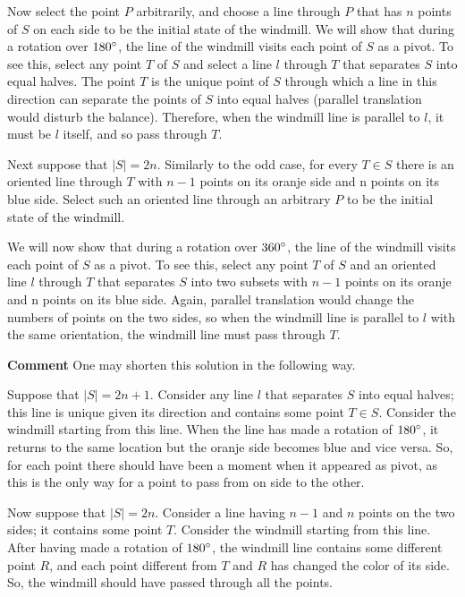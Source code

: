 \begin{problem}
 Now select the point $P$ arbitrarily, and choose a line through $P$ that has $n$ points of $S$ on each side to be the initial state of the windmill. 
We will show that during a rotation over $180\degree$, the line of the windmill visits each point of $S$ as a pivot. To see this, select any point $T$ of $S$ and select a line $l$ through $T$ that separates $S$ into equal halves. The point $T$ is the unique point of $S$ through which a line in this direction can separate the points of $S$ into equal halves (parallel translation would disturb the balance). Therefore, when the windmill line is parallel to $l$, it must be $l$ itself, and so pass through $T$.

Next suppose that $|S| = 2n$. Similarly to the odd case, for every $T \in S$ there is an oriented line through $T$ with $n−1$ points on its oranje side and n points on its blue side. Select such an oriented line through an arbitrary $P$ to be the initial state of the windmill. 

We will now show that during a rotation over $360\degree$, the line of the windmill visits each point of $S$ as a pivot. To see this, select any point $T$ of $S$ and an oriented line $l$ through $T$ that separates $S$ into two subsets with $n − 1$ points on its oranje and n points on its blue side. Again, parallel translation would change the numbers of points on the two sides, so when the windmill line is parallel to $l$ with the same orientation, the windmill line must pass through $T$.

\textbf{Comment} One may shorten this solution in the following way. 

Suppose that $|S| = 2n + 1$. Consider any line $l$ that separates $S$ into equal halves; this line is unique given its direction and contains some point $T \in S$. Consider the windmill starting from this line. When the line has made a rotation of $180\degree$, it returns to the same location but the oranje side becomes blue and vice versa. So, for each point there should have been a moment when it appeared as pivot, as this is the only way for a point to pass from on side to the other. 

Now suppose that $|S| = 2n$. Consider a line having $n−1$ and $n$ points on the two sides; it contains some point $T$. Consider the windmill starting from this line. After having made a rotation of $180\degree$, the windmill line contains some diﬀerent point $R$, and each point diﬀerent from $T$ and $R$ has changed the color of its side. So, the windmill should have passed through all the points.


\end{problem}

